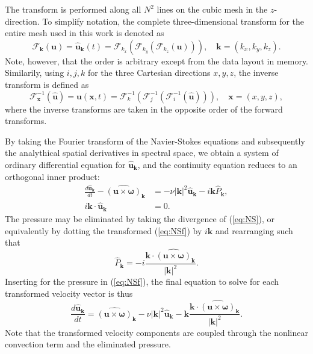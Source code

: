 \documentclass[11pt, oneside]{article}
\begin{document}
The transform is performed along all $N^2$ lines on the cubic mesh in the $z$-direction. To simplify notation, the complete three-dimensional transform for the entire mesh used in this work is denoted as
\begin{equation}
\mathcal{F}_{\bm{k}}(\bm{u}) = \hat{\bm{u}}_{\bm{k}}(t) = \mathcal{F}_{k_x}\left(\mathcal{F}_{k_y}\left(\mathcal{F}_{k_z}(\bm{u})\right)\right), \quad \bm{k}=(k_x, k_y, k_z).
\end{equation}
Note, however, that the order is arbitrary except from the data layout in memory. Similarily, using $i,j,k$ for the three Cartesian directions $x,y,z$, the inverse transform is defined as
\begin{equation}
\mathcal{F}^{-1}_{\bm{x}}(\hat{\bm{u}}) = \bm{u}(\bm{x}, t) = \mathcal{F}^{-1}_{k}\left(\mathcal{F}^{-1}_{j}\left(\mathcal{F}^{-1}_{i}(\hat{\bm{u}})\right)\right), \quad \bm{x} = (x, y, z),
\end{equation}
where the inverse transforms are taken in the opposite order of the forward transforms.

By taking the Fourier transform of the Navier-Stokes equations and subsequently the analythical spatial derivatives in spectral space, we obtain a system of ordinary differential equation for $\hat{\bm{u}}_{\bm{k}}$, and the continuity equation reduces to an orthogonal inner product:
\begin{align}
 \frac{d\hat{\bm{u}}_{\bm{k}}}{d t} - \widehat{( \bm{u} \times \bm{\omega})}_{\bm{k}} &= - \nu |\bm{k}|^2  \hat{\bm{u}}_{\bm{k}} - i \bm{k} \hat{P}_{\bm{k}}, \label{eq:NSf} \\
 i \bm{k} \cdot \hat{\bm{u}}_{\bm{k}} &= 0.
\end{align}
The pressure may be eliminated by taking the divergence of (\ref{eq:NS}), or equivalently by dotting the transformed (\ref{eq:NSf}) by $i \bm{k}$ and rearranging such that
\begin{equation}
\hat{P}_{\bm{k}} = -i \frac{\bm{k} \cdot \widehat{( \bm{u} \times \bm{\omega})}_{\bm{k}} }{|\bm{k}|^2}.
\label{eq:mod_pressure}
\end{equation}
Inserting for the pressure in (\ref{eq:NSf}), the final equation to solve for each transformed velocity vector is thus
\begin{equation}
 \frac{d\hat{\bm{u}}_{\bm{k}}}{d t}  = \widehat{( \bm{u} \times \bm{\omega})}_{\bm{k}} - \nu |\bm{k}|^2  \hat{\bm{u}}_{\bm{k}} - \bm{k} \frac{\bm{k} \cdot \widehat{( \bm{u} \times \bm{\omega})}_{\bm{k}} }{|\bm{k}|^2}. \label{eq:NSfinal}
\end{equation}
Note that the transformed velocity components are coupled through the nonlinear convection term and the eliminated pressure.
\end{document}
